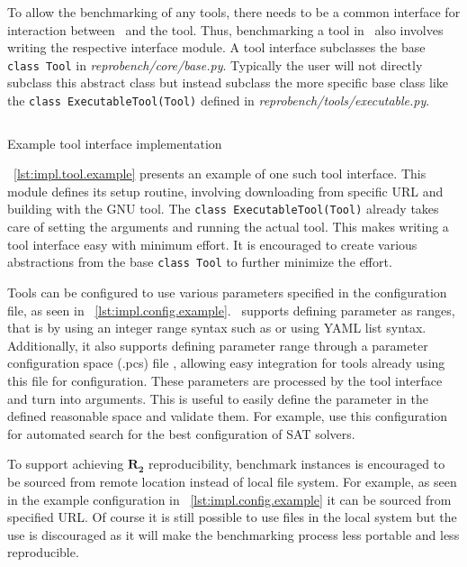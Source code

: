 To allow the benchmarking of any tools, there needs to be a common interface for interaction between \OurBenchmarkingTool~and the tool.
Thus, benchmarking a tool in \OurBenchmarkingTool~also involves writing the respective interface module.
A tool interface subclasses the base \texttt{class Tool} in \emph{reprobench/core/base.py}.
Typically the user will not directly subclass this abstract class but instead subclass the more specific base class like the \texttt{class ExecutableTool(Tool)} defined in \emph{reprobench/tools/executable.py}.

\begin{listing}
    \inputminted[firstline=12]{python}{assets/listings/reprobench/examples/sat/tools/glucose.py}
    \caption{Example tool interface implementation}
    \label{lst:impl.tool.example}
\end{listing}

\lst~\ref{lst:impl.tool.example} presents an example of one such tool interface.
This module defines its setup routine, involving downloading from specific URL and building with the GNU  tool.
The \texttt{class ExecutableTool(Tool)} already takes care of setting the arguments and running the actual tool.
This makes writing a tool interface easy with minimum effort.
It is encouraged to create various abstractions from the base \texttt{class Tool} to further minimize the effort.

Tools can be configured to use various parameters specified in the configuration file, as seen in \lst~\ref{lst:impl.config.example}.
\OurBenchmarkingTool~supports defining parameter as ranges, that is by using an integer range syntax such as  or using YAML list syntax.
Additionally, it also supports defining parameter range through a parameter configuration space (.pcs) file \citep{hutterPcsParameterConfiguration2013}, allowing easy integration for tools already using this file for configuration.
These parameters are processed by the tool interface and turn into arguments.
This is useful to easily define the parameter in the defined reasonable space and validate them.
For example, \citet{falknerSpySMACAutomatedConfiguration2015} use this configuration for automated search for the best configuration of SAT solvers.


To support achieving \(\bm{R_2}\) reproducibility, benchmark instances is encouraged to be sourced from remote location instead of local file system.
For example, as seen in the example configuration in \lst~\ref{lst:impl.config.example} it can be sourced from specified URL.
Of course it is still possible to use files in the local system but the use is discouraged as it will make the benchmarking process less portable and less reproducible.

